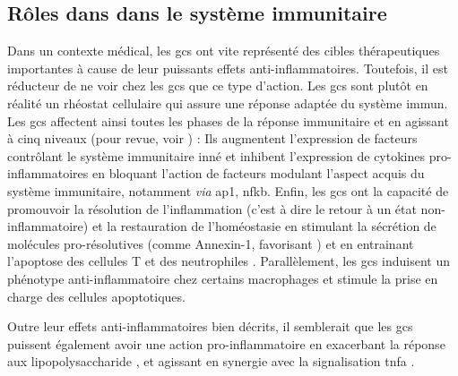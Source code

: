 \documentclass[../main.tex]{subfiles}
\begin{document}

\subsection{Rôles dans dans le système immunitaire}\label{subsec:gc-immune}
Dans un contexte médical, les \glspl{gc} ont vite représenté des cibles thérapeutiques importantes à cause de leur puissants effets anti-inflammatoires.
Toutefois, il est réducteur de ne voir chez les \glspl{gc} que ce type d'action.
Les \glspl{gc} sont plutôt en réalité un rhéostat cellulaire qui assure une réponse adaptée du système immun.
Les \glspl{gc} affectent ainsi toutes les phases de la réponse immunitaire et en agissant à cinq niveaux (pour revue, voir \citealp{Busillo2013}) :
Ils augmentent l'expression de facteurs contrôlant le système immunitaire inné et inhibent l'expression de cytokines pro-inflammatoires en bloquant l'action de facteurs modulant l'aspect acquis du système immunitaire, notamment \textit{via} \gls{ap1}, \gls{nfkb}.
Enfin, les \glspl{gc} ont la capacité de promouvoir la résolution de l'inflammation (c'est à dire le retour à un état non-inflammatoire) et la restauration de l'homéostasie en stimulant la sécrétion de molécules pro-résolutives (comme Annexin-1, favorisant ) et en entrainant l'apoptose des cellules T et des neutrophiles \citep{Parrillo1979}.
Parallèlement, les \glspl{gc} induisent un phénotype anti-inflammatoire chez certains macrophages et stimule la prise en charge des cellules apoptotiques.
\par
Outre leur effets anti-inflammatoires bien décrits, il semblerait que les \glspl{gc} puissent également avoir une action pro-inflammatoire en exacerbant la réponse aux lipopolysaccharide \citep{Munhoz2010,Frank2012}, et agissant en synergie avec la signalisation \gls{tnfa} \citep{Lannan2012}.

\end{document}
